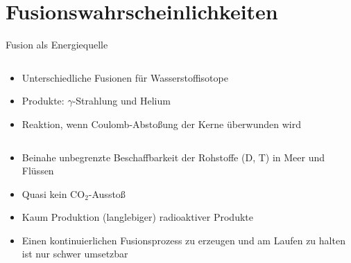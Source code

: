 \section{Fusionswahrscheinlichkeiten}

\begin{frame}{Fusion als Energiequelle}
    \begin{columns}
        \begin{column}{0.55\textwidth}
            \begin{itemize}
                \item<+-> Unterschiedliche Fusionen für Wasserstoffisotope
                \item<+-> Produkte: $\gamma$-Strahlung und Helium
                \item<+-> Reaktion, wenn Coulomb-Abstoßung der Kerne überwunden wird
            \end{itemize}
        \end{column}
        \begin{column}{0.45\textwidth}
            \begin{center}
            \end{center}
        \end{column}
    \end{columns}
    
    \begin{itemize}
        \item<+-> Beinahe unbegrenzte Beschaffbarkeit der Rohstoffe (D, T) in Meer und Flüssen
        \item<+-> Quasi kein $\mathrm{CO_2}$-Ausstoß
        \item<+-> Kaum Produktion (langlebiger) radioaktiver Produkte
    \end{itemize}
    \begin{itemize}
        \item<+-> Einen kontinuierlichen Fusionsprozess zu erzeugen und am Laufen zu halten ist nur schwer umsetzbar
    \end{itemize}
\end{frame}


